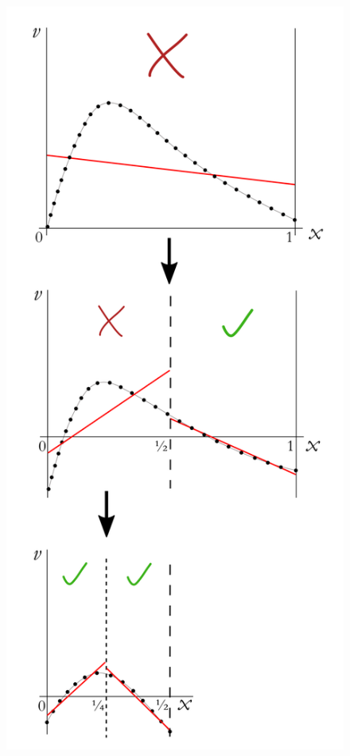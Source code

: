 \begin{figure}[!tbp]
  \centering
  \begin{minipage}[b]{0.4\textwidth}
    \includegraphics[width=\textwidth]{figures/chapter-approximation/figure5}

\end{minipage}
\end{figure}
